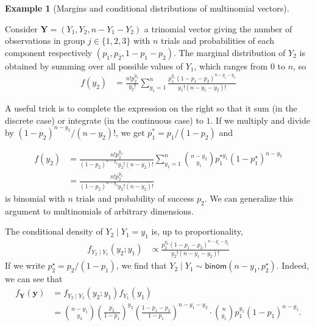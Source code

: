\documentclass[
  11pt,
  letterpaper,
]{scrbook}
\theoremstyle{definition}
\theoremstyle{plain}
\theoremstyle{plain}
\theoremstyle{definition}
\newtheorem{example}{Example}[chapter]
\theoremstyle{definition}
\theoremstyle{remark}
\begin{document}
\begin{example}[Margins and conditional distributions of multinomial
vectors]\protect\hypertarget{exm-marginal-multinom}{}\label{exm-marginal-multinom}

Consider \(\boldsymbol{Y} = (Y_1, Y_2, n-Y_1-Y_2)\) a trinomial vector
giving the number of observations in group \(j \in \{1,2,3\}\) with
\(n\) trials and probabilities of each component respectively
\((p_1, p_2, 1-p_1-p_2)\). The marginal distribution of \(Y_2\) is
obtained by summing over all possible values of \(Y_1\), which ranges
from \(0\) to \(n\), so \begin{align*}
f(y_2) &= \frac{n!p_2^{y_2}}{y_2!}\sum_{y_1=1}^n \frac{p_1^{y_1}(1-p_1 -p_2)^{n-y_1-y_2}}{y_1!(n-y_1-y_2)!}
\end{align*}

A useful trick is to complete the expression on the right so that it sum
(in the discrete case) or integrate (in the continuous case) to \(1.\)
If we multiply and divide by \((1-p_2)^{n-y_2} /(n-y_2)!\), we get
\(p_1^*=p_1/(1-p_2)\) and

\begin{align*}
f(y_2) &= \frac{n!p_2^{y_2}}{(1-p_2)^{n-y_2} y_2!(n-y_2)!}\sum_{y_1=1}^n \binom{n-y_2}{y_1} p_1^{\star y_1}(1-p^{\star}_1)^{n-y_2}
\\&= \frac{n!p_2^{y_2}}{(1-p_2)^{n-y_2} y_2!(n-y_2)!}
\end{align*} is binomial with \(n\) trials and probability of success
\(p_2\). We can generalize this argument to multinomials of arbitrary
dimensions.

The conditional density of \(Y_2 \mid Y_1=y_1\) is, up to
proportionality, \begin{align*}
f_{Y_2 \mid Y_1}(y_2; y_1) &\propto \frac{p_2^{y_2}(1-p_1 -p_2)^{n-y_1-y_2}}{y_2!(n-y_1-y_2)!}
\end{align*} If we write \(p_2^\star=p_2/(1-p_1)\), we find that
\(Y_2 \mid Y_1 \sim \mathsf{binom}(n-y_1, p_2^\star)\). Indeed, we can
see that \begin{align*}
f_{\boldsymbol{Y}}(\boldsymbol{y}) &= f_{Y_2 \mid Y_1}(y_2; y_1) f_{Y_1}(y_1) 
\\&= \binom{n-y_1}{y_2} \left( \frac{p_2}{1-p_1}\right)^{y_2}\left(\frac{1-p_1-p_2}{1-p_1}\right)^{n-y_1-y_2}\!\!\cdot\binom{n}{y_1} p_1^{y_1}(1-p_1)^{n-y_1}.
\end{align*}

\end{example}
\end{document}
